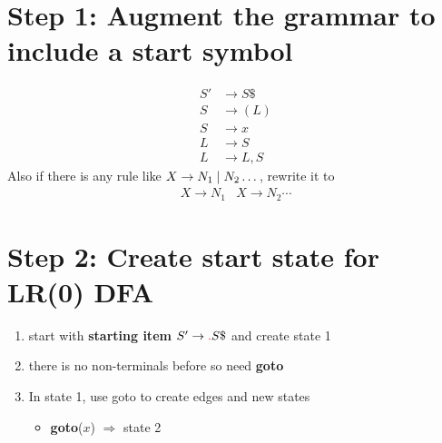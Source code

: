\documentclass[10pt,a4paper,landscape]{article}
\begin{document}
\begin{multicols*}{3}
\section*{Step 1: Augment the grammar to include a start symbol}
\begin{align*}
  S'&\to S\$  \tag{0} \\
  S&\to (L)   \tag{1} \\
  S&\to x     \tag{2} \\
  L&\to S     \tag{3} \\
  L&\to L,S   \tag{4}
\end{align*}
Also if there is any rule like $X\to N_1 \;|\; N_2 \dots$, rewrite it to
\begin{align*}
  X\to N_1 & X\to N_2 \cdots
\end{align*}
\section*{Step 2: Create start state for LR(0) DFA}
\begin{enumerate}
\item start with \textbf{starting item} $S'\to \lrd S\$$ and create state 1
  \begin{center}
  \end{center}
\item there is no non-terminals before  so need \textbf{goto}
\item In state 1, use goto to create edges and new states
  \begin{itemize}
  \item \textbf{goto}($x$) $\Rightarrow$ state 2
  \end{itemize}
  \begin{center}
\end{center}
\end{enumerate}
\end{multicols*}
\end{document}
